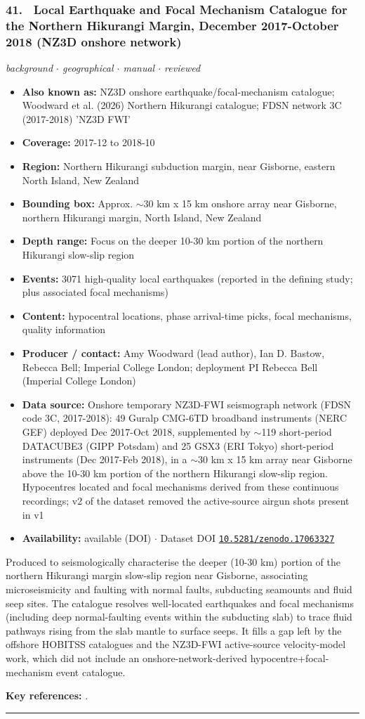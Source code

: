 \documentclass[10pt,a4paper]{article}
\newcommand{\catentryrule}{\par\vspace{3pt}\noindent\textcolor{rulegrey}{\rule{\linewidth}{0.3pt}}\par\vspace{5pt}}
\newcommand{\kv}[2]{\item \textbf{#1:} #2}
\begin{document}
\subsubsection*{\hypertarget{c:41}{41.}~ Local Earthquake and Focal Mechanism Catalogue for the Northern Hikurangi Margin, December 2017-October 2018 (NZ3D onshore network)}
{\small\itshape background $\cdot$ geographical $\cdot$ manual $\cdot$ reviewed}\par\vspace{2pt}
\begin{itemize}[leftmargin=1.3em,itemsep=0.6pt,topsep=1pt,parsep=0pt]
\kv{Also known as}{NZ3D onshore earthquake/focal-mechanism catalogue; Woodward et al. (2026) Northern Hikurangi catalogue; FDSN network 3C (2017-2018) 'NZ3D FWI'}
\kv{Coverage}{2017-12 to 2018-10}
\kv{Region}{Northern Hikurangi subduction margin, near Gisborne, eastern North Island, New Zealand}
\kv{Bounding box}{Approx. $\sim$30 km x 15 km onshore array near Gisborne, northern Hikurangi margin, North Island, New Zealand}
\kv{Depth range}{Focus on the deeper 10-30 km portion of the northern Hikurangi slow-slip region}
\kv{Events}{3071 high-quality local earthquakes (reported in the defining study; plus associated focal mechanisms)}
\kv{Content}{hypocentral locations, phase arrival-time picks, focal mechanisms, quality information}
\kv{Producer / contact}{Amy Woodward (lead author), Ian D. Bastow, Rebecca Bell; Imperial College London; deployment PI Rebecca Bell (Imperial College London)}
\kv{Data source}{Onshore temporary NZ3D-FWI seismograph network (FDSN code 3C, 2017-2018): 49 Guralp CMG-6TD broadband instruments (NERC GEF) deployed Dec 2017-Oct 2018, supplemented by $\sim$119 short-period DATACUBE3 (GIPP Potsdam) and 25 GSX3 (ERI Tokyo) short-period instruments (Dec 2017-Feb 2018), in a $\sim$30 km x 15 km array near Gisborne above the 10-30 km portion of the northern Hikurangi slow-slip region. Hypocentres located and focal mechanisms derived from these continuous recordings; v2 of the dataset removed the active-source airgun shots present in v1}
\kv{Availability}{available (DOI) $\cdot$ Dataset DOI \href{https://doi.org/10.5281/zenodo.17063327}{\nolinkurl{10.5281/zenodo.17063327}}}
\end{itemize}
\par\vspace{2pt}Produced to seismologically characterise the deeper (10-30 km) portion of the northern Hikurangi margin slow-slip region near Gisborne, associating microseismicity and faulting with normal faults, subducting seamounts and fluid seep sites. The catalogue resolves well-located earthquakes and focal mechanisms (including deep normal-faulting events within the subducting slab) to trace fluid pathways rising from the slab mantle to surface seeps. It fills a gap left by the offshore HOBITSS catalogues and the NZ3D-FWI active-source velocity-model work, which did not include an onshore-network-derived hypocentre+focal-mechanism event catalogue.
\par\vspace{2pt}\textbf{Key references:} \cite{Woodward2026,Woodward2025,ImperialCollegeLondonIFDSN2017}.
\catentryrule
\end{document}
